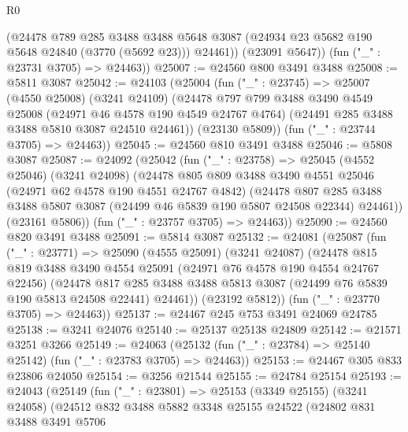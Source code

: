 \begin{lexlean}{R0}
\begin{coremodule}
          (@24478
            @789
            @285
            @3488
            @3488
            @5648
            @3087
            (@24934 @23 @5682 @190 @5648 @24840 (@3770 (@5692 @23)))
            @24461))
        (@23091 @5647))
      (fun ("_" : @23731 @3705) => @24463))
@25007 := @24560 @800 @3491 @3488
@25008 := @5811 @3087
@25042 := @24103
    (@25004
      (fun ("_" : @23745) =>
      @25007
        (@4550 @25008)
        (@3241 @24109)
        (@24478
          @797
          @799
          @3488
          @3490
          @4549
          @25008
          (@24971 @46 @4578 @190 @4549 @24767 @4764)
          (@24491 @285 @3488 @3488 @5810 @3087 @24510 @24461))
        (@23130 @5809))
      (fun ("_" : @23744 @3705) => @24463))
@25045 := @24560 @810 @3491 @3488
@25046 := @5808 @3087
@25087 := @24092
    (@25042
      (fun ("_" : @23758) =>
      @25045
        (@4552 @25046)
        (@3241 @24098)
        (@24478
          @805
          @809
          @3488
          @3490
          @4551
          @25046
          (@24971 @62 @4578 @190 @4551 @24767 @4842)
          (@24478
            @807
            @285
            @3488
            @3488
            @5807
            @3087
            (@24499 @46 @5839 @190 @5807 @24508 @22344)
            @24461))
        (@23161 @5806))
      (fun ("_" : @23757 @3705) => @24463))
@25090 := @24560 @820 @3491 @3488
@25091 := @5814 @3087
@25132 := @24081
    (@25087
      (fun ("_" : @23771) =>
      @25090
        (@4555 @25091)
        (@3241 @24087)
        (@24478
          @815
          @819
          @3488
          @3490
          @4554
          @25091
          (@24971 @76 @4578 @190 @4554 @24767 @22456)
          (@24478
            @817
            @285
            @3488
            @3488
            @5813
            @3087
            (@24499 @76 @5839 @190 @5813 @24508 @22441)
            @24461))
        (@23192 @5812))
      (fun ("_" : @23770 @3705) => @24463))
@25137 := @24467 @245 @753 @3491 @24069 @24785
@25138 := @3241 @24076
@25140 := @25137 @25138 @24809
@25142 := @21571 @3251 @3266
@25149 := @24063 (@25132 (fun ("_" : @23784) => @25140 @25142) (fun ("_" : @23783 @3705) => @24463))
@25153 := @24467 @305 @833 @23806 @24050
@25154 := @3256 @21544
@25155 := @24784 @25154
@25193 := @24043
    (@25149
      (fun ("_" : @23801) =>
      @25153
        (@3349 @25155)
        (@3241 @24058)
        (@24512
          @832
          @3488
          @5882
          @3348
          @25155
          @24522
          (@24802
            @831
            @3488
            @3491
            @5706

\end{coremodule}
\end{lexlean}
